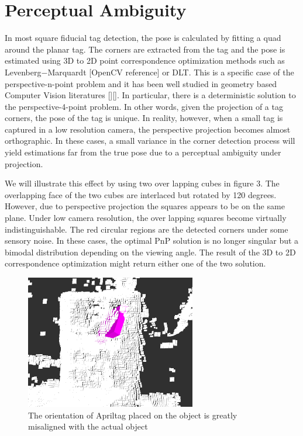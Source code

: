 \section{Perceptual Ambiguity}
\label{sec:problem}
In most square fiducial tag detection, the pose is calculated by fitting a quad around the planar tag. The corners are extracted from the tag and the pose is estimated using 3D to 2D point correspondence optimization methods such as Levenberg$-$Marquardt [OpenCV reference] or DLT. This is a specific case of the perspective-n-point problem and it has been well studied in geometry based Computer Vision literatures [][]. In particular, there is a deterministic solution to the perspective-4-point problem. In other words, given the projection of a tag corners, the pose of the tag is unique. In reality, however,  when a small tag is captured in a low resolution camera, the perspective projection becomes almost orthographic. In these cases, a small variance in the corner detection process will yield estimations far from the true pose due to a perceptual ambiguity under projection. 

We will illustrate this effect by using two over lapping cubes in figure 3. The overlapping face of the two cubes are interlaced but rotated by 120 degrees. However, due to perspective projection the squares appears to be on the same plane. Under low camera resolution, the over lapping squares become virtually indistinguishable. The red circular regions are the detected corners under some sensory noise. In these cases, the optimal PnP solution is no longer singular but a bimodal distribution depending on the viewing angle. The result of the 3D to 2D correspondence optimization might return either one of the two solution.
\begin{figure}
\centering
\includegraphics[width=\columnwidth]{figs/mismatch_tag}
\caption{The orientation of Apriltag placed on the object is greatly misaligned with the actual object}
\label{fig:calib}
\end{figure}

